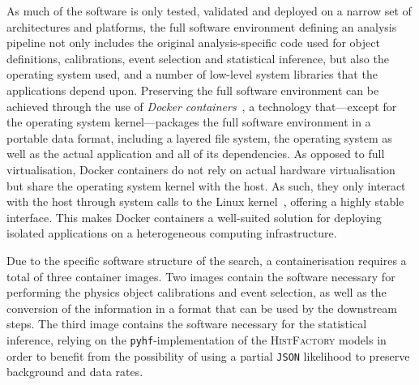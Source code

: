 As much of the software is only tested, validated and deployed on a narrow set of architectures and platforms, the full software environment defining an analysis pipeline not only includes the original analysis-specific code used for object definitions, calibrations, event selection and statistical inference, but also the operating system used, and a number of low-level system libraries that the applications depend upon.
Preserving the full software environment can be achieved through the use of \textit{Docker containers}~\cite{docker,Binet:2134524}, a technology that---except for the operating system kernel---packages the full software environment in a portable data format, including a layered file system, the operating system as well as the actual application and all of its dependencies.
As opposed to full virtualisation, Docker containers do not rely on actual hardware virtualisation but share the operating system kernel with the host. As such, they only interact with the host through system calls to the Linux kernel~\cite{Binet:2134524}, offering a highly stable interface. This makes Docker containers a well-suited solution for deploying isolated applications on a heterogeneous computing infrastructure.

Due to the specific software structure of the \onelepton search, a containerisation requires a total of three container images.
Two images contain the software necessary for performing the physics object calibrations and event selection, as well as the conversion of the information in a format that can be used by the downstream steps. The third image contains the software necessary for the statistical inference, relying on the \texttt{pyhf}-implementation of the \textsc{HistFactory} models in order to benefit from the possibility of using a partial \texttt{JSON} likelihood to preserve background and data rates.
%  

